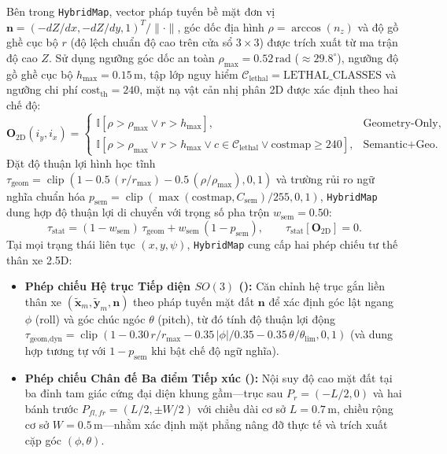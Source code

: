 \documentclass[a4paper,fleqn]{cas-sc}
\begin{document}
Bên trong \texttt{HybridMap}, vector pháp tuyến bề mặt đơn vị $\mathbf{n} = (-dZ/dx, -dZ/dy, 1)^T / \|\cdot\|$, góc dốc địa hình $\rho = \arccos(n_z)$ và độ gồ ghề cục bộ $r$ (độ lệch chuẩn độ cao trên cửa sổ $3 \times 3$) được trích xuất từ ma trận độ cao $Z$. Sử dụng ngưỡng góc dốc an toàn $\rho_{\max} = 0.52\,\text{rad}$ ($\approx 29.8^\circ$), ngưỡng độ gồ ghề cục bộ $h_{\max} = 0.15\,\text{m}$, tập lớp nguy hiểm $\mathcal{C}_{\text{lethal}} = \text{LETHAL\_CLASSES}$ và ngưỡng chi phí $\text{cost}_{\text{th}} = 240$, mặt nạ vật cản nhị phân 2D được xác định theo hai chế độ:
\begin{equation}
    \mathbf{O}_{2\text{D}}(i_y, i_x) =
    \begin{cases}
        \mathbb{I}[\rho > \rho_{\max} \lor r > h_{\max}], & \text{Geometry-Only}, \\[2pt]
        \mathbb{I}[\rho > \rho_{\max} \lor r > h_{\max} \lor c \in \mathcal{C}_{\text{lethal}} \lor \text{costmap} \ge 240], & \text{Semantic+Geo}.
    \end{cases}
\end{equation}
Đặt độ thuận lợi hình học tĩnh $\tau_{\text{geom}} = \operatorname{clip}(1 - 0.5\,(r/r_{\max}) - 0.5\,(\rho/\rho_{\max}), 0, 1)$ và trường rủi ro ngữ nghĩa chuẩn hóa $p_{\text{sem}} = \operatorname{clip}(\max(\text{costmap}, C_{\text{sem}})/255, 0, 1)$, \texttt{HybridMap} dung hợp độ thuận lợi di chuyển với trọng số pha trộn $w_{\text{sem}} = 0.50$:
\begin{equation}
    \tau_{\text{stat}} = (1 - w_{\text{sem}})\,\tau_{\text{geom}} + w_{\text{sem}}\,(1 - p_{\text{sem}}), \qquad \tau_{\text{stat}}[\mathbf{O}_{2\text{D}}] = 0.
\end{equation}
Tại mọi trạng thái liên tục $(x, y, \psi)$, \texttt{HybridMap} cung cấp hai phép chiếu tư thế thân xe 2.5D:
\begin{itemize}
    \item \textbf{Phép chiếu Hệ trục Tiếp diện $SO(3)$ (\citealp{jiayangliu2023}):} Căn chỉnh hệ trục gắn liền thân xe $(\tilde{\mathbf{x}}_m, \tilde{\mathbf{y}}_m, \mathbf{n})$ theo pháp tuyến mặt đất $\mathbf{n}$ để xác định góc lật ngang $\phi$ (roll) và góc chúc ngóc $\theta$ (pitch), từ đó tính độ thuận lợi động $\tau_{\text{geom,dyn}} = \operatorname{clip}(1 - 0.30\,r/r_{\max} - 0.35\,|\phi|/0.35 - 0.35\,\theta/\theta_{\text{lim}}, 0, 1)$ (và dung hợp tương tự với $1 - p_{\text{sem}}$ khi bật chế độ ngữ nghĩa).
    \item \textbf{Phép chiếu Chân đế Ba điểm Tiếp xúc (\citealp{geraldsteinbauer2025}):} Nội suy độ cao mặt đất tại ba đỉnh tam giác cứng đại diện khung gầm—trục sau $P_r = (-L/2, 0)$ và hai bánh trước $P_{fl,fr} = (L/2, \pm W/2)$ với chiều dài cơ sở $L = 0.7\,\text{m}$, chiều rộng cơ sở $W = 0.5\,\text{m}$—nhằm xác định mặt phẳng nâng đỡ thực tế và trích xuất cặp góc $(\phi, \theta)$.
\end{itemize}
\end{document}
